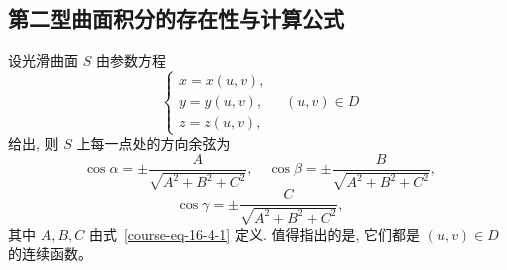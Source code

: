 \documentclass[12pt,fontset=fandol]{ctexart}
\begin{document}
\subsection{第二型曲面积分的存在性与计算公式}

设光滑曲面 $S$ 由参数方程
\begin{equation}
  \begin{cases}
    x=x(u,v),\\
    y=y(u,v),\\
    z=z(u,v),
  \end{cases}\quad (u,v)\in D
  \label{course-eq-16-4-3}
\end{equation}
给出, 则 $S$ 上每一点处的方向余弦为
\[
  \cos\alpha=\pm\frac{A}{\sqrt{A^2+B^2+C^2}},\quad
  \cos\beta=\pm\frac{B}{\sqrt{A^2+B^2+C^2}},
\]
\[
  \cos\gamma=\pm\frac{C}{\sqrt{A^2+B^2+C^2}},
\]
其中 $A,B,C$ 由式~\eqref{course-eq-16-4-1}  定义. 值得指出的是, 它们都是 $(u,v)\in D$ 的连续函数。
\end{document}
